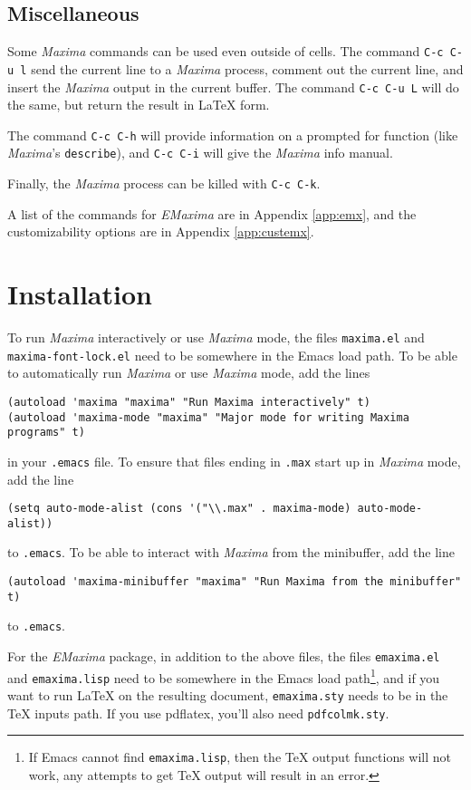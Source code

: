 \documentclass{article}
\newcommand{\emx}{\textsl{\sffamily EMaxima}}
\newcommand{\mx}{\textsl{\sffamily Maxima}}
\begin{document}
\subsection{Miscellaneous}

\noindent
Some \mx{} commands can be used even outside of cells.  The command 
\texttt{C-c C-u l} send the current line to a
\mx{} process, comment out the current line, and insert the \mx{}
output in the current buffer.  The command 
\texttt{C-c C-u L} will do the same, but
return the result in \LaTeX{} form.

The command \texttt{C-c C-h} will provide
information on a prompted for function (like \mx's \texttt{describe}), 
and  \texttt{C-c C-i} will give the \mx{} info manual.

Finally, the \mx{} process can be killed with \texttt{C-c C-k}.

A list of the commands for \emx{} are in Appendix \ref{app:emx}, and
the customizability options are in Appendix \ref{app:custemx}.

\newpage
\appendix

\section{Installation}

To run \mx{} interactively or use \mx{} mode, the files
\texttt{maxima.el} and \texttt{maxima-font-lock.el} need to be
somewhere in the Emacs load path.  To be able to automatically run
\mx{} or use \mx{} mode, add the lines\\
\begin{verbatim}
(autoload 'maxima "maxima" "Run Maxima interactively" t)
(autoload 'maxima-mode "maxima" "Major mode for writing Maxima programs" t)
\end{verbatim}
\noindent
in your \texttt{.emacs} file.  
To ensure that files ending in \texttt{.max} start up in \mx{} mode,
add the line
\begin{verbatim}
(setq auto-mode-alist (cons '("\\.max" . maxima-mode) auto-mode-alist))
\end{verbatim}
to \texttt{.emacs}.  To be able to interact with \mx{} from the
minibuffer, add the line
\begin{verbatim}
(autoload 'maxima-minibuffer "maxima" "Run Maxima from the minibuffer" t)
\end{verbatim}
\noindent
to \texttt{.emacs}.

For the \emx{} package, in addition to the above files, the files
\texttt{emaxima.el} and \texttt{emaxima.lisp} need to be somewhere in
the Emacs load path\footnote{If Emacs cannot find
  \texttt{emaxima.lisp}, then the \TeX{} output functions will not
  work, any attempts to get \TeX{} output will result in an error.},
  and if you want to run \LaTeX{} on the resulting document,
\texttt{emaxima.sty} needs to be in the \TeX{} inputs path.  If you
use pdflatex, you'll also need \texttt{pdfcolmk.sty}.
\end{document}
